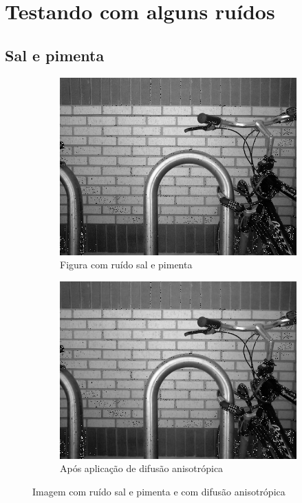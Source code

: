 \documentclass[10pt,a4paper]{article}
\begin{document}
\section{Testando com alguns ruídos}
\subsection{Sal e pimenta}

\begin{figure}[!ht]
    \centering
    \begin{subfigure}[ht]{0.4\textwidth}
        \includegraphics[width=\textwidth]{dst_sp.jpg}
        \caption{Figura com ruído sal e pimenta\cite{bike}}
        \label{fig:src_sp}
    \end{subfigure}
    \qquad
    \begin{subfigure}[ht]{0.4\textwidth}
        \includegraphics[width=\textwidth]{aniso_sp.jpg}
        \caption{\centering Após aplicação de difusão anisotrópica}
        \label{fig:aniso_diff_sp}
    \end{subfigure}
    \caption{Imagem com ruído sal e pimenta e com difusão anisotrópica}
    \label{fig:aniso_diff_sp}
\end{figure}
\end{document}
